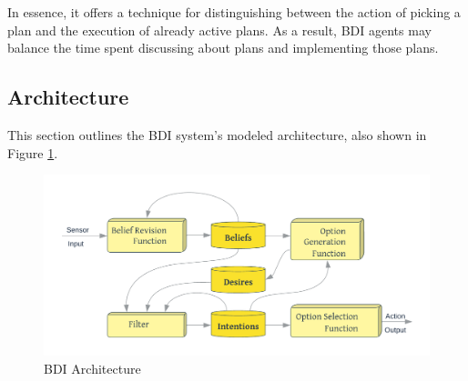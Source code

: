 \vspace{.5cm}

In essence, it offers a technique for distinguishing between the action of picking a plan and the execution of already active plans. As a result, \ac{BDI} agents may balance the time spent discussing about plans and implementing those plans.

\subsection{Architecture}

This section outlines the \ac{BDI} system's modeled architecture, also shown in Figure \ref{BDI Architecture}.

    \begin{figure}[h]
    \centering
      \includegraphics[width=12cm]{includes/figures/BDI_arch.png}
      \caption{\ac{BDI} Architecture \cite{bdiarch}}
      \label{BDI Architecture}
    \end{figure}
    
